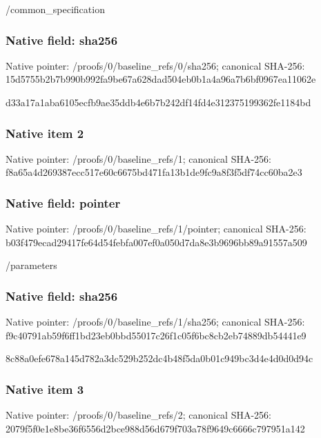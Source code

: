 \documentclass[10pt,a4paper]{article}
\begin{document}
\begingroup\raggedright\sloppy /\allowbreak{}common\_\allowbreak{}specification\par\endgroup

\subsubsection{Native field: sha256}
Native pointer: /proofs/0/baseline\_\allowbreak{}refs/0/sha256; canonical SHA-256: 15d5755b2b7b990b992fa9be67a628dad504eb0b1a4a96a7b6bf0967ea11062e

\begingroup\raggedright\sloppy d33a17a1aba6105ecfb9ae35ddb4e6b7b242df14fd4e312375199362fe1184bd\par\endgroup

\subsubsection{Native item 2}
Native pointer: /proofs/0/baseline\_\allowbreak{}refs/1; canonical SHA-256: f8a65a4d269387ecc517e60c6675bd471fa13b1de9fc9a8f3f5df74cc60ba2e3

\subsubsection{Native field: pointer}
Native pointer: /proofs/0/baseline\_\allowbreak{}refs/1/pointer; canonical SHA-256: b03f479ecad29417fe64d54febfa007ef0a050d7da8e3b9696bb89a91557a509

\begingroup\raggedright\sloppy /\allowbreak{}parameters\par\endgroup

\subsubsection{Native field: sha256}
Native pointer: /proofs/0/baseline\_\allowbreak{}refs/1/sha256; canonical SHA-256: f9c40791ab59f6ff1bd23eb0bbd55017c26f1c05f6bc8cb2eb74889db54441e9

\begingroup\raggedright\sloppy 8c88a0efe678a145d782a3dc529b252dc4b48f5da0b01c949bc3d4e4d0d0d94c\par\endgroup

\subsubsection{Native item 3}
Native pointer: /proofs/0/baseline\_\allowbreak{}refs/2; canonical SHA-256: 2079f5f0e1e8be36f6556d2bce988d56d679f703a78f9649c6666c797951a142
\end{document}
